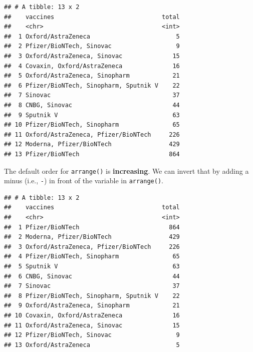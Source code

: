\documentclass[
]{book}
\newenvironment{Shaded}{\begin{snugshade}}{\end{snugshade}}
\newcommand{\DataTypeTok}[1]{\textcolor[rgb]{0.13,0.29,0.53}{#1}}
\newcommand{\KeywordTok}[1]{\textcolor[rgb]{0.13,0.29,0.53}{\textbf{#1}}}
\newcommand{\NormalTok}[1]{#1}
\newcommand{\OperatorTok}[1]{\textcolor[rgb]{0.81,0.36,0.00}{\textbf{#1}}}
\newcommand{\StringTok}[1]{\textcolor[rgb]{0.31,0.60,0.02}{#1}}
\begin{document}
\begin{Shaded}
\end{Shaded}

\begin{verbatim}
## # A tibble: 13 x 2
##    vaccines                              total
##    <chr>                                 <int>
##  1 Oxford/AstraZeneca                        5
##  2 Pfizer/BioNTech, Sinovac                  9
##  3 Oxford/AstraZeneca, Sinovac              15
##  4 Covaxin, Oxford/AstraZeneca              16
##  5 Oxford/AstraZeneca, Sinopharm            21
##  6 Pfizer/BioNTech, Sinopharm, Sputnik V    22
##  7 Sinovac                                  37
##  8 CNBG, Sinovac                            44
##  9 Sputnik V                                63
## 10 Pfizer/BioNTech, Sinopharm               65
## 11 Oxford/AstraZeneca, Pfizer/BioNTech     226
## 12 Moderna, Pfizer/BioNTech                429
## 13 Pfizer/BioNTech                         864
\end{verbatim}

The default order for \texttt{arrange()} is \textbf{increasing}. We can invert that by adding a minus (i.e., \texttt{-}) in front of the variable in \texttt{arrange()}.

\begin{Shaded}
\end{Shaded}

\begin{verbatim}
## # A tibble: 13 x 2
##    vaccines                              total
##    <chr>                                 <int>
##  1 Pfizer/BioNTech                         864
##  2 Moderna, Pfizer/BioNTech                429
##  3 Oxford/AstraZeneca, Pfizer/BioNTech     226
##  4 Pfizer/BioNTech, Sinopharm               65
##  5 Sputnik V                                63
##  6 CNBG, Sinovac                            44
##  7 Sinovac                                  37
##  8 Pfizer/BioNTech, Sinopharm, Sputnik V    22
##  9 Oxford/AstraZeneca, Sinopharm            21
## 10 Covaxin, Oxford/AstraZeneca              16
## 11 Oxford/AstraZeneca, Sinovac              15
## 12 Pfizer/BioNTech, Sinovac                  9
## 13 Oxford/AstraZeneca                        5
\end{verbatim}
\end{document}
